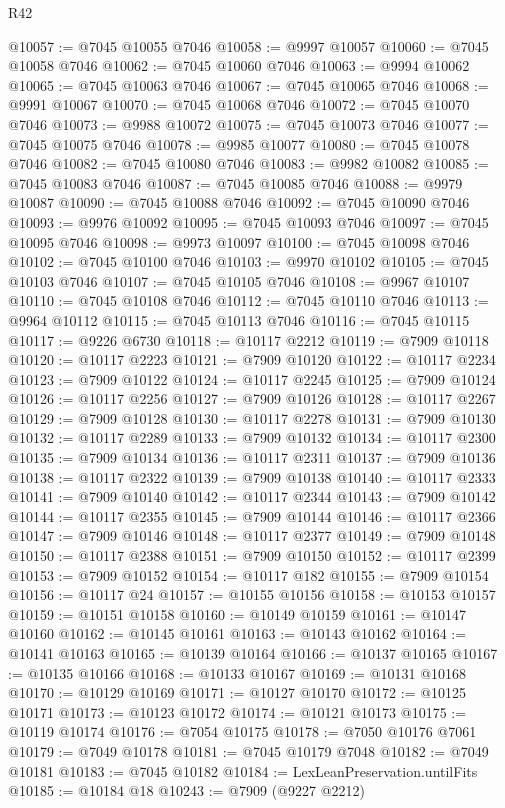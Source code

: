 \begin{lexlean}{R42}
\begin{coremodule}
{@10057 := @7045 @10055 @7046
@10058 := @9997 @10057
@10060 := @7045 @10058 @7046
@10062 := @7045 @10060 @7046
@10063 := @9994 @10062
@10065 := @7045 @10063 @7046
@10067 := @7045 @10065 @7046
@10068 := @9991 @10067
@10070 := @7045 @10068 @7046
@10072 := @7045 @10070 @7046
@10073 := @9988 @10072
@10075 := @7045 @10073 @7046
@10077 := @7045 @10075 @7046
@10078 := @9985 @10077
@10080 := @7045 @10078 @7046
@10082 := @7045 @10080 @7046
@10083 := @9982 @10082
@10085 := @7045 @10083 @7046
@10087 := @7045 @10085 @7046
@10088 := @9979 @10087
@10090 := @7045 @10088 @7046
@10092 := @7045 @10090 @7046
@10093 := @9976 @10092
@10095 := @7045 @10093 @7046
@10097 := @7045 @10095 @7046
@10098 := @9973 @10097
@10100 := @7045 @10098 @7046
@10102 := @7045 @10100 @7046
@10103 := @9970 @10102
@10105 := @7045 @10103 @7046
@10107 := @7045 @10105 @7046
@10108 := @9967 @10107
@10110 := @7045 @10108 @7046
@10112 := @7045 @10110 @7046
@10113 := @9964 @10112
@10115 := @7045 @10113 @7046
@10116 := @7045 @10115
@10117 := @9226 @6730
@10118 := @10117 @2212
@10119 := @7909 @10118
@10120 := @10117 @2223
@10121 := @7909 @10120
@10122 := @10117 @2234
@10123 := @7909 @10122
@10124 := @10117 @2245
@10125 := @7909 @10124
@10126 := @10117 @2256
@10127 := @7909 @10126
@10128 := @10117 @2267
@10129 := @7909 @10128
@10130 := @10117 @2278
@10131 := @7909 @10130
@10132 := @10117 @2289
@10133 := @7909 @10132
@10134 := @10117 @2300
@10135 := @7909 @10134
@10136 := @10117 @2311
@10137 := @7909 @10136
@10138 := @10117 @2322
@10139 := @7909 @10138
@10140 := @10117 @2333
@10141 := @7909 @10140
@10142 := @10117 @2344
@10143 := @7909 @10142
@10144 := @10117 @2355
@10145 := @7909 @10144
@10146 := @10117 @2366
@10147 := @7909 @10146
@10148 := @10117 @2377
@10149 := @7909 @10148
@10150 := @10117 @2388
@10151 := @7909 @10150
@10152 := @10117 @2399
@10153 := @7909 @10152
@10154 := @10117 @182
@10155 := @7909 @10154
@10156 := @10117 @24
@10157 := @10155 @10156
@10158 := @10153 @10157
@10159 := @10151 @10158
@10160 := @10149 @10159
@10161 := @10147 @10160
@10162 := @10145 @10161
@10163 := @10143 @10162
@10164 := @10141 @10163
@10165 := @10139 @10164
@10166 := @10137 @10165
@10167 := @10135 @10166
@10168 := @10133 @10167
@10169 := @10131 @10168
@10170 := @10129 @10169
@10171 := @10127 @10170
@10172 := @10125 @10171
@10173 := @10123 @10172
@10174 := @10121 @10173
@10175 := @10119 @10174
@10176 := @7054 @10175
@10178 := @7050 @10176 @7061
@10179 := @7049 @10178
@10181 := @7045 @10179 @7048
@10182 := @7049 @10181
@10183 := @7045 @10182
@10184 := LexLeanPreservation.untilFits
@10185 := @10184 @18
@10243 := @7909
    (@9227 @2212)
}
\end{coremodule}
\end{lexlean}
